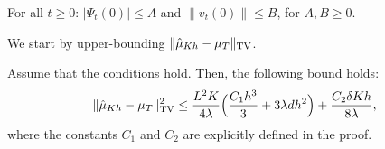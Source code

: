 %
\begin{assumption}
\label{asmp:init_fun}
For all $t \geq 0$: $|\Psi_t(0)| \leq A$ and $\|v_t(0)\| \leq B$,
for $A,B \geq 0$.
\end{assumption}


 
We start by upper-bounding $\| \hat{\mu}_{Kh} - \mu_T \|_{\textnormal{TV}}$. 
%
\begin{lemma}
\label{lem:euler}
Assume that the conditions  hold. Then, the following bound holds:
\begin{align}
\| \hat{\mu}_{Kh} - \mu_{T} \|_{\textnormal{TV}}^2 \leq \frac{L^2 K}{4\lambda} \Bigl( \frac{C_1 h^3}{3} + 3 \lambda d h^2 \Bigr) + \frac{C_2 \delta K h}{8\lambda},
\end{align}
where the constants $C_1$ and $C_2$ are explicitly defined in the proof. 
\end{lemma}
%
